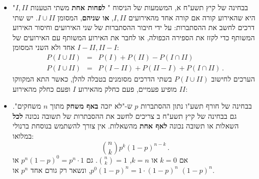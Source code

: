 \begin{itemize}

\item
בבחינה של קיץ תשע"ח א, המשמעות של הניסוח "%
\textbf{לפחות אחת}
משתי הטענות 
$I, II$"
היא שהאירוע קורה אם קורה אחד מהאירועים
$I, II$,
\textbf{או שניהם},
המסומן 
$I \cup II$.
יש שתי דרכים לחשב את ההסתברות: על ידי חיבור ההסתברות של שני האירועים וחיסור האירוע המשותף כדי לקזז את הספירה הכפולה, או לחבר את האירוע המשותף עם האירועים של אחד ולא השני המסומן 
$I-II, II-I$:
\begin{eqnarray*}
P(I \cup II) &=& P(I) + P(II) - P(I \cap II)\\
P(I \cup II) &=& P(I-II) + P(II-I) + P(I \cap II)\,.
\end{eqnarray*}
הערכים לחישוב
$P(I \cup II)$
בשתי הדרכים מסומנים בטבלה להלן, כאשר התא המקווקו מופיע פעמיים, פעם כחלק מהאירוע
$I$
ופעם כחלק מהאירוע
$II$:
\begin{center}
\end{center}


\item
בבחינה של חורף תשע"ו נתון ההסתברות
$p$
ש-"לא יזכה
\textbf{באף משחק}
מתוך 
$n$
משחקים". גם בבחינה של  קיץ תשע"ח ב צריכים לחשב את ההסבתרות של תשובה נכונה 
\textbf{לכל}
השאלות או תשובה נכונה
\textbf{לאף אחת}
מהשאלות.  אין צורך להשתמש בנוסחת ברנולי במלואו:
\[
{n \choose k}p^k(1-p)^{n-k}\,.
\]
אם
$k=0$
או
$k=n$,
${n\choose k}=1$.
גם
$p^n(1-p)^0=p^n\cdot 1$
או
$p^0(1-p)^n=1\cdot(1-p)^n$,
ונשאר רק גורם אחד 
$p^n$
או
$(1-p)^n$.


\end{itemize}
